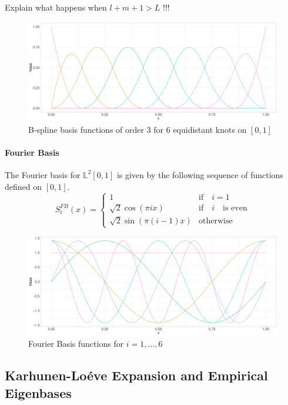 \documentclass[11pt,twoside,a4paper]{article}
\begin{document}
	{\color{red}Explain what happens when $l+m+1 > L$ !!!}
	
	\begin{figure}[H]
	\includegraphics[width = \textwidth]{Graphics/Bspline_Basis.pdf}
	\caption{B-spline basis functions of order 3 for 6 equidistant knots on $[0,1]$}
	\end{figure}
	
	\paragraph{Fourier Basis}
	The Fourier basis for $\mathbb{L}^2[0,1]$ is given by the following sequence of functions defined on $[0,1]$.
	\begin{equation}
		S_{i}^{FB}(x) = \begin{cases}
			1 & \text{if} \quad i = 1\\
			\sqrt{2} \cos(\pi i x) & \text{if} \quad i \quad \text{is even} \\
			\sqrt{2} \sin(\pi (i-1)x) & \text{otherwise}
		\end{cases}
	\end{equation}
	
	\begin{figure}[H]
	\includegraphics[width = \textwidth]{Graphics/Fourier_Basis.pdf}
	\caption{Fourier Basis functions for $i = 1,\dots,6$}
	\end{figure}
	
	\subsection{Karhunen-Lo\'{e}ve Expansion and Empirical Eigenbases}
\end{document}
